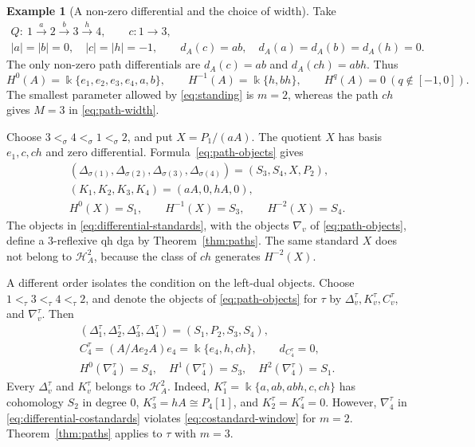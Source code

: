 \documentclass[11pt,a4paper]{article}
\renewcommand{\H}{\mathcal H}
\newcommand{\std}{\Delta}
\newcommand{\costd}{\nabla}
\theoremstyle{plain}
\theoremstyle{definition}
\newtheorem{example}[theorem]{Example}
\numberwithin{equation}{section}
\begin{document}
\begin{example}[A non-zero differential and the choice of width]
\label{ex:differential}
Take
\begin{equation}\label{eq:differential-example}
 \begin{gathered}
 Q:\ 1\xrightarrow{a}2\xrightarrow{b}3\xrightarrow{h}4,
 \qquad c:1\to3,\\
 |a|=|b|=0,\quad |c|=|h|=-1,\qquad
 d_A(c)=ab,\quad d_A(a)=d_A(b)=d_A(h)=0.
 \end{gathered}
\end{equation}
The only non-zero path differentials are $d_A(c)=ab$ and
$d_A(ch)=abh$. Thus
\begin{equation}\label{eq:differential-cohomology}
 H^0(A)=\Bbbk\{e_1,e_2,e_3,e_4,a,b\},\qquad
 H^{-1}(A)=\Bbbk\{h,bh\},
 \qquad H^q(A)=0\ (q\notin[-1,0]).
\end{equation}
The smallest parameter allowed by \eqref{eq:standing} is $m=2$,
whereas the path $ch$ gives $M=3$ in \eqref{eq:path-width}.

Choose $3<_\sigma4<_\sigma1<_\sigma2$, and put
$X=P_1/(aA)$. The quotient $X$ has basis $e_1,c,ch$ and zero
differential. Formula~\eqref{eq:path-objects} gives
\begin{equation}\label{eq:differential-standards}
 \begin{gathered}
 (\std_{\sigma(1)},\std_{\sigma(2)},\std_{\sigma(3)},\std_{\sigma(4)})
       =(S_3,S_4,X,P_2),\\
 (K_1,K_2,K_3,K_4)=(aA,0,hA,0),\\
 H^0(X)=S_1,\qquad H^{-1}(X)=S_3,\qquad H^{-2}(X)=S_4.
 \end{gathered}
\end{equation}
The objects in \eqref{eq:differential-standards}, with the objects
$\costd_v$ of \eqref{eq:path-objects}, define a $3$-reflexive qh dga
by Theorem~\ref{thm:paths}. The same standard $X$ does not belong to
$\H_A^2$, because the class of $ch$ generates $H^{-2}(X)$.

A different order isolates the condition on the left-dual objects.
Choose $1<_\tau3<_\tau4<_\tau2$, and denote the objects
of \eqref{eq:path-objects} for $\tau$ by
$\std_v^\tau,K_v^\tau,C_v^\tau$, and $\costd_v^\tau$.
Then
\begin{equation}\label{eq:differential-costandards}
 \begin{gathered}
 (\std_1^\tau,\std_2^\tau,\std_3^\tau,\std_4^\tau)
       =(S_1,P_2,S_3,S_4),\\
 C_4^\tau=(A/Ae_2A)e_4=\Bbbk\{e_4,h,ch\},
 \qquad d_{C_4^\tau}=0,\\
 H^0(\costd_4^\tau)=S_4,\quad H^1(\costd_4^\tau)=S_3,\quad
 H^2(\costd_4^\tau)=S_1.
 \end{gathered}
\end{equation}
Every $\std_v^\tau$ and $K_v^\tau$ belongs to $\H_A^2$.
Indeed, $K_1^\tau=\Bbbk\{a,ab,abh,c,ch\}$ has cohomology $S_2$
in degree $0$, $K_3^\tau=hA\cong P_4[1]$, and
$K_2^\tau=K_4^\tau=0$.
However, $\costd_4^\tau$ in \eqref{eq:differential-costandards} violates
\eqref{eq:costandard-window} for $m=2$.
Theorem~\ref{thm:paths} applies to $\tau$ with $m=3$.


\end{example}
\end{document}
